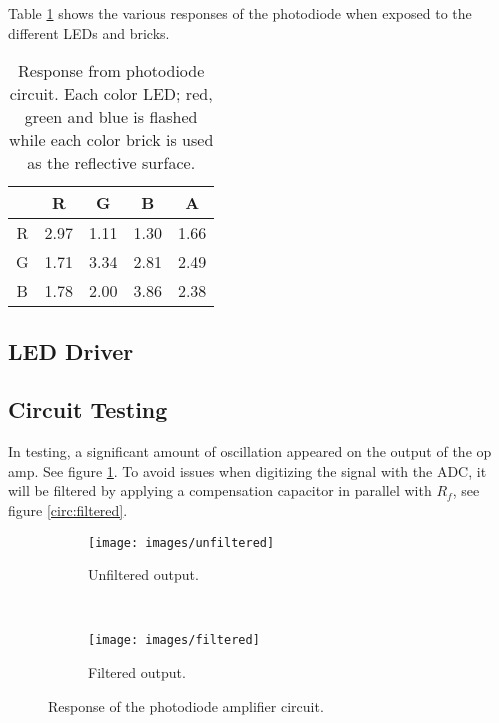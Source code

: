 Table \ref{tab:ledtable} shows the various responses of the photodiode when exposed to the different LEDs and bricks.

\begin{table}
	\centering
	\begin{tabular}{| c | c | c | c | c |}
		\hline
		\diagbox{LED}{BRICK}& R & G & B & A\\
		\hline
		R & 2.97 & 1.11 & 1.30 & 1.66\\
		\hline
		G & 1.71 & 3.34 & 2.81 & 2.49\\
		\hline
		B & 1.78 & 2.00 & 3.86 & 2.38\\
		\hline
	\end{tabular}
	\caption[Response from photodiode circuit.]{Response from photodiode circuit. Each color LED; red, green and blue is flashed while each color brick is used as the reflective surface.}
	\label{tab:ledtable}
\end{table}
\subsection{LED Driver}
\subsection{Circuit Testing}
In testing, a significant amount of oscillation appeared on the output of the op amp. See figure \ref{fig:oscillation}. To avoid issues when digitizing the signal with the ADC, it will be filtered by applying a compensation capacitor in parallel with $R_f$, see figure \ref{circ:filtered}.

\begin{figure}[h!]
	\centering
	\begin{subfigure}{\linewidth}
		\texttt{[image: images/unfiltered]}
		\caption{Unfiltered output.}
		\label{fig:oscillation}
	\end{subfigure}\\
	\begin{subfigure}{\linewidth}
		\texttt{[image: images/filtered]}
		\caption{Filtered output.}
		\label{fig:nooscillation}
	\end{subfigure}
	\caption{Response of the photodiode amplifier circuit.}
	\label{fig:photoresponse}
\end{figure}

